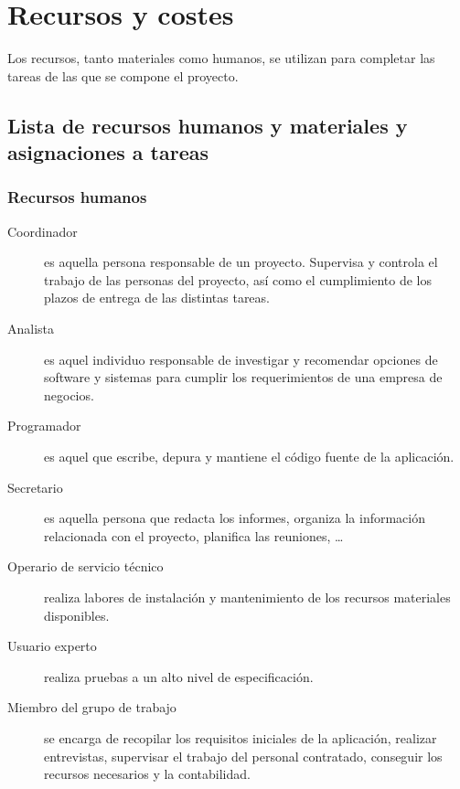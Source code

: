 \documentclass[11pt,a4paper,spanish,twoside]{book}
\begin{document}
\chapter{Recursos y costes}
Los recursos, tanto materiales como humanos, se utilizan para completar las
tareas de las que se compone el proyecto.


\section{Lista de recursos humanos y materiales y asignaciones a 
  tareas}

\subsection{Recursos humanos}
\begin{description}
\item[Coordinador] es aquella persona responsable de un proyecto. Supervisa y
  controla el trabajo de las personas del proyecto, así como el cumplimiento
  de los plazos de entrega de las distintas tareas. 

\item[Analista] es aquel individuo responsable de investigar y
  recomendar opciones de software y sistemas para cumplir los requerimientos
  de una empresa de negocios.  

\item[Programador] es aquel que escribe, depura y mantiene el código fuente
  de la aplicación.  

\item[Secretario] es aquella persona que redacta los informes, organiza la
  información relacionada con el proyecto, planifica las reuniones, \dots

\item[Operario de servicio técnico] realiza labores de instalación y
  mantenimiento de los recursos materiales disponibles.

\item[Usuario experto] realiza pruebas a un alto nivel de especificación.

\item[Miembro del grupo de trabajo] se encarga de recopilar los requisitos
  iniciales de la aplicación, realizar entrevistas, supervisar el trabajo del
  personal  contratado, conseguir los recursos necesarios y la contabilidad.  

\end{description}
\end{document}
